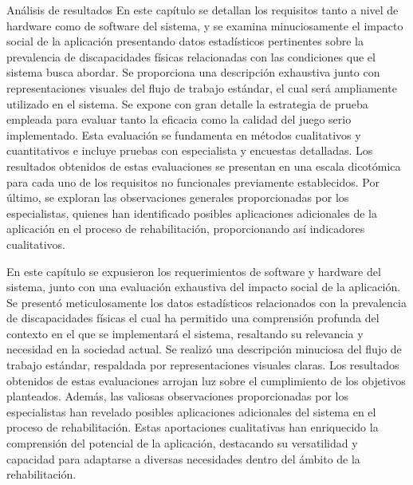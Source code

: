 \begin{thesischapter}{3} {Análisis de resultados}
En este capítulo se detallan los requisitos tanto a nivel de hardware como de software del sistema, y se examina minuciosamente el impacto social de la aplicación presentando datos estadísticos pertinentes sobre la prevalencia de discapacidades físicas relacionadas con las condiciones que el sistema busca abordar. Se proporciona una descripción exhaustiva junto con representaciones visuales del flujo de trabajo estándar, el cual será ampliamente utilizado en el sistema. Se expone con gran detalle la estrategia de prueba empleada para evaluar tanto la eficacia como la calidad del juego serio implementado. Esta evaluación se fundamenta en métodos cualitativos y cuantitativos e incluye pruebas con especialista y encuestas detalladas. Los resultados obtenidos de estas evaluaciones se presentan en una escala dicotómica para cada uno de los requisitos no funcionales previamente establecidos. Por último, se exploran las observaciones generales proporcionadas por los especialistas, quienes han identificado posibles aplicaciones adicionales de la aplicación en el proceso de rehabilitación, proporcionando así indicadores cualitativos.
    






En este capítulo se expusieron los requerimientos de software y hardware del sistema, junto con una evaluación exhaustiva del impacto social de la aplicación. Se presentó meticulosamente los datos estadísticos relacionados con la prevalencia de discapacidades físicas el cual ha permitido una comprensión profunda del contexto en el que se implementará el sistema, resaltando su relevancia y necesidad en la sociedad actual. Se realizó una descripción minuciosa del flujo de trabajo estándar, respaldada por representaciones visuales claras. Los resultados obtenidos de estas evaluaciones arrojan luz sobre el cumplimiento de los objetivos planteados. Además, las valiosas observaciones proporcionadas por los especialistas han revelado posibles aplicaciones adicionales del sistema en el proceso de rehabilitación. Estas aportaciones cualitativas han enriquecido la comprensión del potencial de la aplicación, destacando su versatilidad y capacidad para adaptarse a diversas necesidades dentro del ámbito de la rehabilitación.

\end{thesischapter}